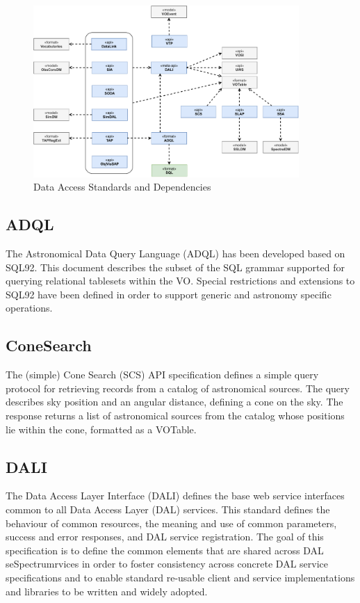 \documentclass[11pt,letter]{ivoa}
\begin{document}
\begin{figure}[ht]
\centering
\includegraphics[width=0.90\textwidth]{ivoa-arch-dal.pdf}
\caption{Data Access Standards and Dependencies}
\label{fig:daldeps}
\end{figure}


\subsection{ADQL}

The Astronomical Data Query Language (ADQL) \citep{2023ivoa.spec.1215M} has been developed based on SQL92. This document 
describes the subset of the SQL grammar supported for querying relational tablesets within the VO. Special restrictions and 
extensions to SQL92 have been defined in order to support generic and astronomy 
specific operations. 

\subsection{ConeSearch}

The (simple) Cone Search (SCS) \citep{2008ivoa.specQ0222P} API specification defines a simple query protocol for retrieving 
records from a catalog of astronomical sources. The query describes sky position and an 
angular distance, defining a cone on the sky. The response returns a list of astronomical 
sources from the catalog whose positions lie within the cone, formatted as a VOTable. 

\subsection{DALI}
\label{dal:dali}

The Data Access Layer Interface (DALI) \citep{2017ivoa.spec.0517D} defines the base web service interfaces common to all Data 
Access Layer (DAL) services. This standard defines the behaviour of common resources, the 
meaning and use of common parameters, success and error responses, and DAL service 
registration. The goal of this specification is to define the common elements that are 
shared across DAL seSpectrumrvices in order to foster consistency across concrete DAL service 
specifications and to enable standard re-usable client and service implementations and 
libraries to be written and widely adopted. 
\end{document}
